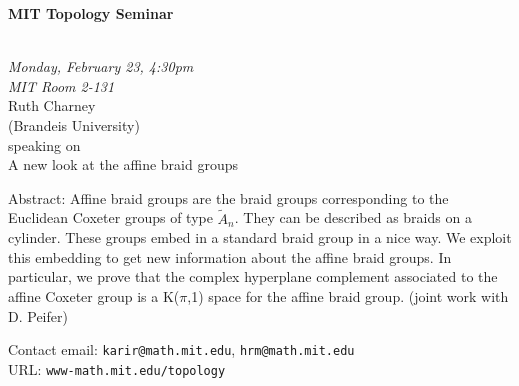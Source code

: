 \documentclass{slides}
\begin{document}
\begin{center}

{\fontsize {54pt}{40pt}\selectfont

\textrm{
{\textbf{MIT Topology Seminar}}}
}\\
\vspace{1cm}
{\large\textrm{\emph{Monday, February 23, 4:30pm\\MIT Room 2-131}}}\\
\vspace{1cm}
\textrm{{\LARGE Ruth Charney  \\[.5cm](Brandeis University)}}\\
\vspace{1cm} %
\textrm{speaking on}\\ %
\vspace{5mm}
\textrm{{\LARGE A new look at the affine braid groups}}\\
\end{center}
\vspace{1cm}
{\small
Abstract:  Affine braid groups are the braid groups corresponding to 
the Euclidean Coxeter groups of type $\tilde A_n$. They can be 
described as braids on a cylinder. These groups embed in a standard 
braid group in a nice way.  We exploit this embedding to get new 
information about the affine braid groups. In particular, we prove that 
the complex hyperplane complement associated to the affine Coxeter 
group is a K($\pi$,1) space for the affine braid group. (joint work 
with D. Peifer)

\textrm{Contact email: } \texttt{karir@math.mit.edu}, 
\texttt{hrm@math.mit.edu}\\
\textrm{URL: } \texttt{www-math.mit.edu/topology}
}
\end{document}
